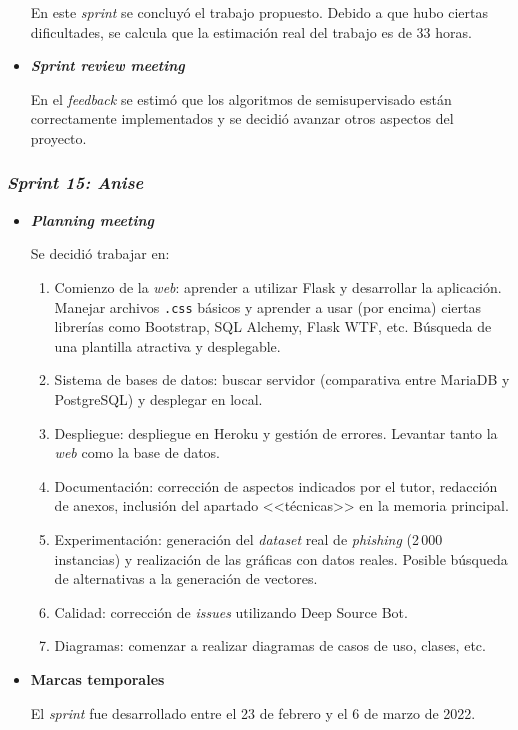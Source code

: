 \begin{itemize}
	En este \textit{sprint} se concluyó el trabajo propuesto. Debido a que hubo ciertas dificultades, se calcula que la estimación real del trabajo es de 33 horas.


	\item \textbf{\textit{Sprint review meeting}}
	
	En el \textit{feedback} se estimó que los algoritmos de semisupervisado están correctamente implementados y se decidió avanzar otros aspectos del proyecto.
\end{itemize}


\subsubsection{\textit{Sprint 15: Anise}}
\begin{itemize}
	\item \textbf{\textit{Planning meeting}}
	
	Se decidió trabajar en:
	\begin{enumerate}
		\item Comienzo de la \textit{web}: aprender a utilizar Flask y desarrollar la aplicación. Manejar archivos \texttt{.css} básicos y aprender a usar (por encima) ciertas librerías como Bootstrap, SQL Alchemy, Flask WTF, etc. Búsqueda de una plantilla atractiva y desplegable.
		\item Sistema de bases de datos: buscar servidor (comparativa entre MariaDB y PostgreSQL) y desplegar en local.
		\item Despliegue: despliegue en Heroku y gestión de errores. Levantar tanto la \textit{web} como la base de datos.
		\item Documentación: corrección de aspectos indicados por el tutor, redacción de anexos, inclusión del apartado <<técnicas>> en la memoria principal.
		\item Experimentación: generación del \textit{dataset} real de \textit{phishing} (2\,000 instancias) y realización de las gráficas con datos reales. Posible búsqueda de alternativas a la generación de vectores.
		\item Calidad: corrección de \textit{issues} utilizando Deep Source Bot.
		\item Diagramas: comenzar a realizar diagramas de casos de uso, clases, etc.
		
	\end{enumerate}
	\item \textbf{Marcas temporales}		
	
	El \textit{sprint} fue desarrollado entre el 23 de febrero y el 6 de marzo de 2022.
	

\end{itemize}
